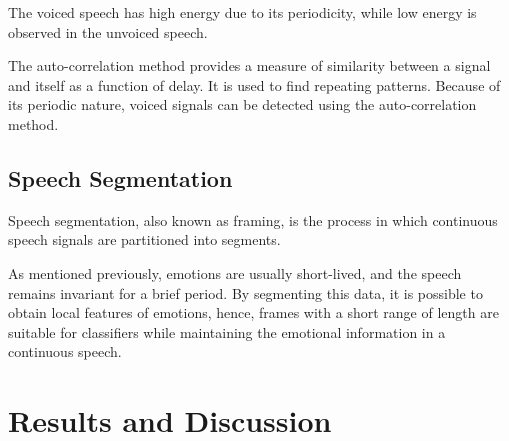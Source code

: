 The voiced speech has high energy due to its periodicity, while low energy is observed in the unvoiced speech.

The auto-correlation method provides a measure of similarity between a signal and itself as a function of delay. It is used to find repeating patterns. Because of its periodic nature, voiced signals can be detected using the auto-correlation method.

\subsection{Speech Segmentation}

Speech segmentation, also known as framing, is the process in which continuous speech signals are partitioned into segments.

As mentioned previously, emotions are usually short-lived, and the speech remains invariant for a brief period. By segmenting this data, it is possible to obtain local features of emotions, hence, frames with a short range of length are suitable for classifiers while maintaining the emotional information in a continuous speech.



\section{Results and Discussion}




